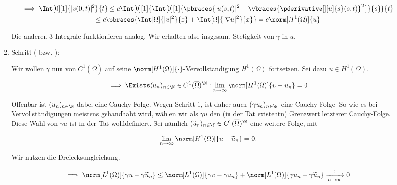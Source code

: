 \begin{solution}
\begin{enumerate}[label = \textbf{\alph*)}]
\begin{enumerate}[label = \arabic*.]
    \begin{multline*}
      \implies
      \Int[0][1]{|v(0, t)|^2}{t}
      \leq
      c
      \Int[0][1]
      {
        \Int[0][1]
        {
          \pbraces
          {
            |u(s, t)|^2
            +
            \vbraces
            {
              \pderivative[][u]{s}(s, t)
            }^2
          }
        }{s}
      }{t} \\
      \leq
      c
      \pbraces
      {
        \Int[\Omega]{|u|^2}{x}
        +
        \Int[\Omega]{|\nabla u|^2}{x}
      }
      =
      c \norm[H^1(\Omega)]{u}
    \end{multline*}

    Die anderen $3$ Integrale funktionieren analog.
    Wir erhalten also insgesamt Stetigkeit von $\gamma$ in $u$.

    \item Schritt ( bzw. ):

    Wir wollen $\gamma$ nun von $C^1(\overline{\Omega})$ auf seine $\norm[H^1(\Omega)]{\cdot}$-Vervollständigung $H^1(\Omega)$ fortsetzen.
    Sei dazu $u \in H^1(\Omega)$.

    \begin{align*}
      \implies
      \Exists (u_n)_{n \in \N} \in C^1(\overline{\Omega})^\N:
      \lim_{n \to \infty}
      \norm[H^1(\Omega)]{u - u_n}
      =
      0
    \end{align*}

    Offenbar ist $(u_n)_{n \in \N}$ dabei eine Cauchy-Folge.
    Wegen Schritt 1, ist daher auch $(\gamma u_n)_{n \in \N}$ eine Cauchy-Folge.
    So wie es bei Vervollständigungen meistens gehandhabt wird, wählen wir als $\gamma u$ den (in der Tat existentn) Grenzwert letzterer Cauchy-Folge. \\

    Diese Wahl von $\gamma u$ ist in der Tat wohldefiniert.
    Sei nämlich $(\widetilde{u}_n)_{n \in \N} \in C^1(\overline{\Omega})^\N$ eine weitere Folge, mit

    \begin{align*}
      \lim_{n \to \infty}
      \norm[H^1(\Omega)]{u - \widetilde{u}_n}
      =
      0.
    \end{align*}

    Wir nutzen die Dreiecksungleichung.

    \begin{align*}
      \implies
      \norm[L^1(\Omega)]{\gamma u - \gamma \widetilde{u}_n}
      \leq
      \norm[L^1(\Omega)]{\gamma u - \gamma u_n}
      +
      \norm[L^1(\Omega)]{\gamma u_n - \gamma \widetilde{u}_n}
      \xrightarrow[n \to \infty]{!}
      0
    \end{align*}


\end{enumerate}
\end{enumerate}
\end{solution}

